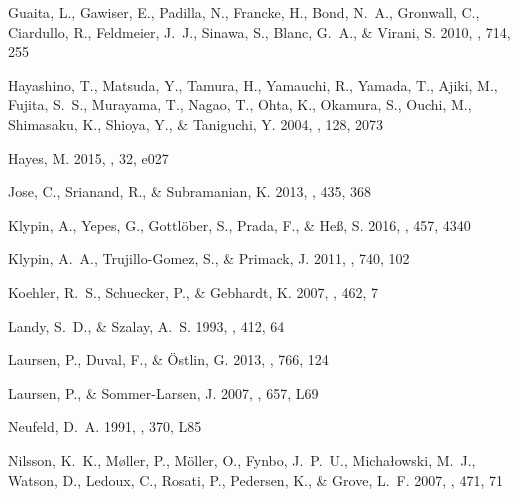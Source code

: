 \documentclass{emulateapj}
\begin{document}
\begin{thebibliography}{43}
{Guaita}, L., {Gawiser}, E., {Padilla}, N., {Francke}, H., {Bond}, N.~A.,
  {Gronwall}, C., {Ciardullo}, R., {Feldmeier}, J.~J., {Sinawa}, S., {Blanc},
  G.~A., \& {Virani}, S. 2010, \apj, 714, 255

{Hayashino}, T., {Matsuda}, Y., {Tamura}, H., {Yamauchi}, R., {Yamada}, T.,
  {Ajiki}, M., {Fujita}, S.~S., {Murayama}, T., {Nagao}, T., {Ohta}, K.,
  {Okamura}, S., {Ouchi}, M., {Shimasaku}, K., {Shioya}, Y., \& {Taniguchi}, Y.
  2004, \aj, 128, 2073

{Hayes}, M. 2015, \pasa, 32, e027

{Jose}, C., {Srianand}, R., \& {Subramanian}, K. 2013, \mnras, 435, 368

{Klypin}, A., {Yepes}, G., {Gottl{\"o}ber}, S., {Prada}, F., \& {He{\ss}}, S.
  2016, \mnras, 457, 4340

{Klypin}, A.~A., {Trujillo-Gomez}, S., \& {Primack}, J. 2011, \apj, 740, 102

{Koehler}, R.~S., {Schuecker}, P., \& {Gebhardt}, K. 2007, \aap, 462, 7

{Landy}, S.~D., \& {Szalay}, A.~S. 1993, \apj, 412, 64

{Laursen}, P., {Duval}, F., \& {{\"O}stlin}, G. 2013, \apj, 766, 124

{Laursen}, P., \& {Sommer-Larsen}, J. 2007, \apjl, 657, L69

{Neufeld}, D.~A. 1991, \apjl, 370, L85

{Nilsson}, K.~K., {M{\o}ller}, P., {M{\"o}ller}, O., {Fynbo}, J.~P.~U.,
  {Micha{\l}owski}, M.~J., {Watson}, D., {Ledoux}, C., {Rosati}, P.,
  {Pedersen}, K., \& {Grove}, L.~F. 2007, \aap, 471, 71


\end{thebibliography}
\end{document}
